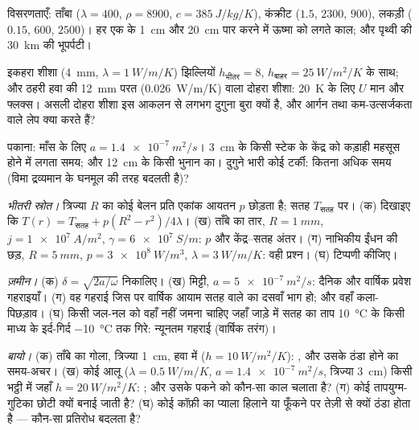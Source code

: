 \begin{exercise}[$\star$]\label{exo:b2:heat-conduction:2}
विसरणताएँ: ताँबा ($\lambda = 400$, $\rho = 8900$, $c = \qty{385}{J/kg/K}$),
कंक्रीट ($1.5$, $2300$, $900$), लकड़ी ($0.15$, $600$, $2500$)। हर एक के \qty{1}{cm}
और \qty{20}{cm} पार करने में ऊष्मा को लगते काल; और पृथ्वी की \qty{30}{km}
की भूपर्पटी।
\end{exercise}

\begin{exercise}[$\star$]\label{exo:b2:heat-conduction:3}
इकहरा शीशा (\qty{4}{mm}, $\lambda = \qty{1}{W/m/K}$) झिल्लियों $h_{\text{भीतर}}
= 8$, $h_{\text{बाहर}} = \qty{25}{W/m^2/K}$ के साथ; और ठहरी हवा की \qty{12}{mm}
परत (\qty{0.026}{W/m/K}) वाला दोहरा शीशा: \qty{20}{K} के लिए $U$ मान और फ्लक्स।
असली दोहरा शीशा इस आकलन से लगभग दुगुना बुरा क्यों है,
और आर्गन तथा कम-उत्सर्जकता वाले लेप क्या करते हैं?
\end{exercise}

\begin{exercise}[$\star$]\label{exo:b2:heat-conduction:4}
पकाना: माँस के लिए $a = \qty{1.4e-7}{m^2/s}$। \qty{3}{cm} के किसी स्टेक के
केंद्र को कड़ाही महसूस होने में लगता समय; और \qty{12}{cm} के किसी भुनान का। दुगुने
भारी कोई टर्की: कितना अधिक समय (विमा द्रव्यमान के घनमूल की
तरह बदलती है)?
\end{exercise}

\begin{exercise}[$\star\star$]\label{exo:b2:heat-conduction:5}
\emph{भीतरी स्रोत।} त्रिज्या $R$ का कोई बेलन प्रति एकांक आयतन $p$
छोड़ता है; सतह $T_{\text{सतह}}$ पर। (क) दिखाइए कि $T(r) = T_{\text{सतह}} +
p(R^2 - r^2)/4\lambda$। (ख) ताँबे का तार, $R = \qty{1}{mm}$, $j =
\qty{1e7}{A/m^2}$, $\gamma = \qty{6e7}{S/m}$: $p$ और केंद्र--सतह
अंतर। (ग) नाभिकीय ईंधन की छड़, $R = \qty{5}{mm}$, $p = \qty{3e8}{W/m^3}$,
$\lambda = \qty{3}{W/m/K}$: वही प्रश्न। (घ) टिप्पणी कीजिए।
\end{exercise}

\begin{exercise}[$\star\star$]\label{exo:b2:heat-conduction:6}
\emph{ज़मीन।} (क) $\delta = \sqrt{2a/\omega}$ निकालिए। (ख) मिट्टी,
$a = \qty{5e-7}{m^2/s}$: दैनिक और वार्षिक प्रवेश गहराइयाँ। (ग) वह गहराई
जिस पर वार्षिक आयाम सतह वाले का दसवाँ भाग हो; और वहाँ कला-पिछड़ाव।
(घ) किसी जल-नल को वहाँ नहीं जमना चाहिए जहाँ जाड़े में सतह का ताप
\qty{10}{\celsius} के किसी माध्य के इर्द-गिर्द \qty{-10}{\celsius} तक गिरे:
न्यूनतम गहराई (वार्षिक तरंग)।
\end{exercise}

\begin{exercise}[$\star\star$]\label{exo:b2:heat-conduction:7}
\emph{बायो।} (क) ताँबे का गोला, त्रिज्या \qty{1}{cm}, हवा में ($h =
\qty{10}{W/m^2/K}$): , और उसके ठंडा होने का समय-अचर। (ख) कोई
आलू ($\lambda = \qty{0.5}{W/m/K}$, $a = \qty{1.4e-7}{m^2/s}$, त्रिज्या
\qty{3}{cm}) किसी भट्ठी में जहाँ $h = \qty{20}{W/m^2/K}$: ; और उसके
पकने को कौन-सा काल चलाता है? (ग) कोई तापयुग्म-गुटिका छोटी क्यों बनाई जाती है?
(घ) कोई कॉफ़ी का प्याला हिलाने या फूँकने पर तेज़ी से क्यों ठंडा होता है ---
कौन-सा प्रतिरोध बदलता है?
\end{exercise}

